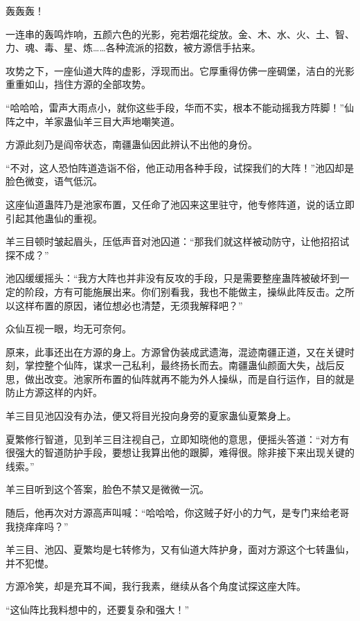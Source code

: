 
\begin{this_body}



轰轰轰！

一连串的轰鸣炸响，五颜六色的光影，宛若烟花绽放。金、木、水、火、土、智、力、魂、毒、星、炼……各种流派的招数，被方源信手拈来。

攻势之下，一座仙道大阵的虚影，浮现而出。它厚重得仿佛一座碉堡，洁白的光影重重如山，挡住方源的全部攻势。

“哈哈哈，雷声大雨点小，就你这些手段，华而不实，根本不能动摇我方阵脚！”仙阵之中，羊家蛊仙羊三目大声地嘲笑道。

方源此刻乃是阎帝状态，南疆蛊仙因此辨认不出他的身份。

“不对，这人恐怕阵道造诣不俗，他正动用各种手段，试探我们的大阵！”池囚却是脸色微变，语气低沉。

这座仙道蛊阵乃是池家布置，又任命了池囚来这里驻守，他专修阵道，说的话立即引起其他蛊仙的重视。

羊三目顿时皱起眉头，压低声音对池囚道：“那我们就这样被动防守，让他招招试探不成？”

池囚缓缓摇头：“我方大阵也并非没有反攻的手段，只是需要整座蛊阵被破坏到一定的阶段，方有可能施展出来。你们别看我，我也不能做主，操纵此阵反击。之所以这样布置的原因，诸位想必也清楚，无须我解释吧？”

众仙互视一眼，均无可奈何。

原来，此事还出在方源的身上。方源曾伪装成武遗海，混迹南疆正道，又在关键时刻，掌控整个仙阵，谋求一己私利，最终扬长而去。南疆蛊仙颜面大失，战后反思，做出改变。池家所布置的仙阵就再不能为外人操纵，而是自行运作，目的就是防止方源这样的内奸。

羊三目见池囚没有办法，便又将目光投向身旁的夏家蛊仙夏繁身上。

夏繁修行智道，见到羊三目注视自己，立即知晓他的意思，便摇头答道：“对方有很强大的智道防护手段，要想让我算出他的跟脚，难得很。除非接下来出现关键的线索。”

羊三目听到这个答案，脸色不禁又是微微一沉。

随后，他再次对方源高声叫喊：“哈哈哈，你这贼子好小的力气，是专门来给老哥我挠痒痒吗？”

羊三目、池囚、夏繁均是七转修为，又有仙道大阵护身，面对方源这个七转蛊仙，并不犯憷。

方源冷笑，却是充耳不闻，我行我素，继续从各个角度试探这座大阵。

“这仙阵比我料想中的，还要复杂和强大！”


\end{this_body}
